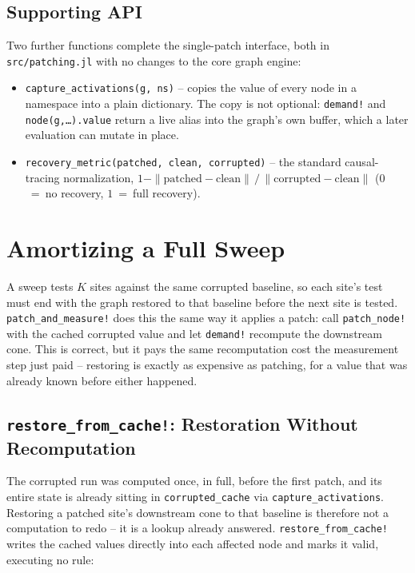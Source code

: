 \documentclass{article}
\begin{document}
\subsection{Supporting API}

Two further functions complete the single-patch interface, both in \texttt{src/patching.jl} with
no changes to the core graph engine:
\begin{itemize}
    \item \texttt{capture\_activations(g, ns)} -- copies the value of every node in a namespace
    into a plain dictionary. The copy is not optional: \texttt{demand!} and
    \texttt{node(g,\ldots).value} return a live alias into the graph's own buffer, which a later
    evaluation can mutate in place.
    \item \texttt{recovery\_metric(patched, clean, corrupted)} -- the standard causal-tracing
    normalization, $1 - \|\text{patched} - \text{clean}\| \,/\, \|\text{corrupted} - \text{clean}\|$
    ($0$~=~no recovery, $1$~=~full recovery).
\end{itemize}

\section{Amortizing a Full Sweep}
\label{sec:sweep}

A sweep tests $K$ sites against the same corrupted baseline, so each site's test must end with
the graph restored to that baseline before the next site is tested. \texttt{patch\_and\_measure!}
does this the same way it applies a patch: call \texttt{patch\_node!} with the cached corrupted
value and let \texttt{demand!} recompute the downstream cone. This is correct, but it pays the
same recomputation cost the measurement step just paid -- restoring is exactly as expensive as
patching, for a value that was already known before either happened.

\subsection{\texttt{restore\_from\_cache!}: Restoration Without Recomputation}

The corrupted run was computed once, in full, before the first patch, and its entire state is
already sitting in \texttt{corrupted\_cache} via \texttt{capture\_activations}. Restoring a
patched site's downstream cone to that baseline is therefore not a computation to redo -- it is a
lookup already answered. \texttt{restore\_from\_cache!} writes the cached values directly into
each affected node and marks it valid, executing no rule:
\end{document}
